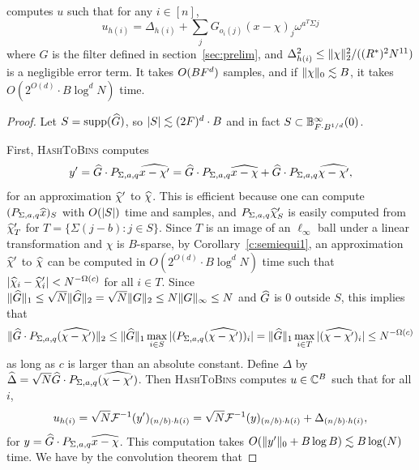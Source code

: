 \begin{lemma}\label{l:hashtobins}
   computes
  $u$ such that for any $i \in [n]$,
  \[
  u_{h(i)} = \Delta_{h(i)} + \sum_j G_{o_i(j)}(x - \chi)_j \omega^{a^T\Sigma j}
  \]
  where $G$ is the filter defined in section~\ref{sec:prelim}, and $\Delta_{h(i)}^2 \leq \norm{2}{\chi}^2
  / ((R^*)^2N^{11})$ is a negligible error term.  It takes $O(B \fc^d)$
  samples, and if $\norm{0}{\chi} \lesssim B$, it takes $O(2^{O(d)}\cdot B\log^d N)$ time.
\end{lemma}
\begin{proof}
  Let $S = \supp(\wh{G})$, so $\abs{S} \lesssim (2\fc)^d\cdot B$ and in fact
  $S \subset \B^\infty_{\fc \cdot B^{1/d}}(0)$.

  First, \textsc{HashToBins} computes
 \[
  y'=\wh{G} \cdot P_{\Sigma, a, q}\wh{x - \chi'}=\wh{G} \cdot P_{\Sigma, a, q}\wh{x - \chi}+\wh{G} \cdot P_{\Sigma, a, q}\wh{\chi - \chi'},
  \]
  for an approximation $\wh{\chi}'$ to $\wh{\chi}$.  This is efficient
  because one can compute $(P_{\Sigma, a, q}\wh{x})_S$ with
  $O(\abs{S})$ time and samples, and $P_{\Sigma, a, q}\wh{\chi}'_S$ is
  easily computed from $\wh{\chi}'_T$ for $T = \{\Sigma(j-b) : j \in
  S\}$.  Since $T$ is an image of an $\ell_\infty$ ball under a linear transformation and $\chi$ is $B$-sparse, by
Corollary~\ref{c:semiequi1}, an approximation $\wh{\chi}'$ to
  $\wh{\chi}$ can be computed in $O(2^{O(d)}\cdot B\log^d N)$ time such
  that $|\wh{\chi}_i-\wh{\chi}'_i|<N^{-\Omega(c)}$
  for all $i\in T$. Since $\norm{1}{\wh{G}} \leq
  \sqrt{N}\norm{2}{\wh{G}} = \sqrt{N}\norm{2}{G} \leq N
  \norm{\infty}{G} \leq N$ and $\wh{G}$ is $0$ outside $S$, this
  implies that
  \begin{equation}\label{eq:gh-norm}
    \norm{2}{\wh{G}\cdot P_{\Sigma, a, q}(\wh{\chi-\chi'})}\leq \norm{1}{\wh{G}}\max_{i \in S} \abs{(P_{\Sigma, a, q}(\wh{\chi-\chi'}))_i} = \norm{1}{\wh{G}}\max_{i \in T} \abs{(\wh{\chi-\chi'})_i} \leq N^{-\Omega(c)}
  \end{equation}
  as long as $c$ is larger than an absolute constant. 
  Define $\Delta$ by $\wh{\Delta}=\sqrt{N}\wh{G}\cdot P_{\Sigma, a, q}(\wh{\chi-\chi'})$.  Then \textsc{HashToBins} computes $u \in
  \C^B$ such that for all $i$,
  \[
  u_{h(i)} =
  \sqrt{N}\F^{-1}(y')_{(n/b)\cdot h(i)}=\sqrt{N}\F^{-1}(y)_{(n/b)\cdot h(i)}+\Delta_{(n/b)\cdot h(i)},
  \]
  for $y = \wh{G} \cdot P_{\Sigma, a, q}\wh{x - \chi}$.  This
  computation takes $O(\norm{0}{y'} + B \log B) \lesssim B \log (N)$
  time.  We have by the convolution theorem that

\end{proof}
